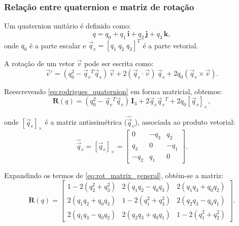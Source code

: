 \subsubsection{Relação entre quaternion e matriz de rotação}
Um quaternion unitário é definido como:
\begin{equation}
q = q_0 + q_1 \, \mathbf{i} + q_2 \, \mathbf{j} + q_3 \, \mathbf{k},
\label{eq:def_quaternion}
\end{equation}
onde $q_0$ é a parte escalar e $\vec{q}_v = [q_1 \; q_2 \; q_3]^T$ é a parte vetorial.  

A rotação de um vetor $\vec{v}$ pode ser escrita como:
\begin{equation}
\vec{v}' = (q_0^2 -
\vec q_v{^T} \vec{q}_v)\,\vec{v} 
+ 2(\vec{q}_v \cdot \vec{v})\,\vec{q}_v
+ 2q_0 (\vec{q}_v \times \vec{v}).
\label{eq:rodrigues_quaternion}
\end{equation}

Reescrevendo \eqref{eq:rodrigues_quaternion} em forma matricial, obtemos:
\begin{equation}
\mathbf{R}(q) = (q_0^2 - \vec{q}_v{^T} \vec{q}_v)\,\mathbf{I}_3 
+ 2 \vec{q}_v \vec{q}_v{^T}
+ 2q_0 [\vec{q}_v]_\times,
\label{eq:rot_matrix_general}
\end{equation}

onde $[\vec{q}_v]_\times$ é a matriz antissimétrica
($\hat{\vec{q}}_v$), associada ao produto vetorial:
\begin{equation}
\hat{\vec{q}}_v = [\vec{q}_v]_\times =
\begin{bmatrix}
0 & -q_3 & q_2 \\
q_3 & 0 & -q_1 \\
-q_2 & q_1 & 0
\end{bmatrix}.
\label{eq:skew_matrix}
\end{equation}

Expandindo os termos de \eqref{eq:rot_matrix_general}, obtém-se a matriz:
\begin{equation}
\mathbf{R}(q) =
\begin{bmatrix}
1 - 2(q_2^2+q_3^2) & 2(q_1q_2 - q_0q_3) & 2(q_1q_3+q_0q_2) \\
2(q_1q_2+q_0q_3)   & 1 - 2(q_1^2+q_3^2) & 2(q_2q_3 - q_0q_1) \\
2(q_1q_3 - q_0q_2) & 2(q_2q_3+q_0q_1)   & 1 - 2(q_1^2+q_2^2)
\end{bmatrix}.
\label{eq:rot_matrix_expandida}
\end{equation}

